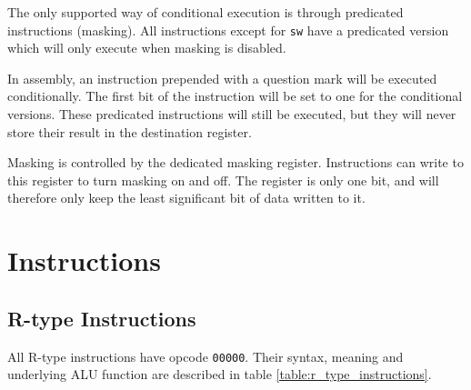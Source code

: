 \documentclass[../main/report.tex]{subfiles}
\begin{document}
The only supported way of conditional execution is through predicated instructions (masking).
All instructions except for \verb/sw/ have a predicated version which will only execute when masking is disabled.

In assembly, an instruction prepended with a question mark will be executed conditionally.
The first bit of the instruction will be set to one for the conditional versions.
These predicated instructions will still be executed, but they will never store their result in the destination register.

Masking is controlled by the dedicated masking register.
Instructions can write to this register to turn masking on and off.
The register is only one bit, and will therefore only keep the least significant bit of data written to it.

\clearpage

\section{Instructions}

\subsection{R-type Instructions}

All R-type instructions have opcode \verb/00000/.
Their syntax, meaning and underlying ALU function are described in table \ref{table:r_type_instructions}.
\end{document}
